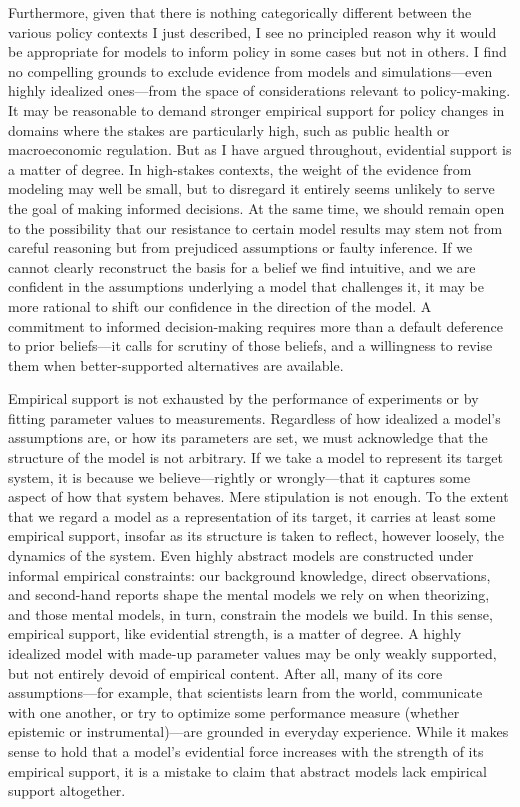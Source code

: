 \documentclass{article}
\begin{document}
Furthermore, given that there is nothing categorically different between the various policy contexts I just described, I see no principled reason why it would be appropriate for models to inform policy in some cases but not in others. I find no compelling grounds to exclude evidence from models and simulations—even highly idealized ones—from the space of considerations relevant to policy-making. It may be reasonable to demand stronger empirical support for policy changes in domains where the stakes are particularly high, such as public health or macroeconomic regulation. But as I have argued throughout, evidential support is a matter of degree. In high-stakes contexts, the weight of the evidence from modeling may well be small, but to disregard it entirely seems unlikely to serve the goal of making informed decisions. At the same time, we should remain open to the possibility that our resistance to certain model results may stem not from careful reasoning but from prejudiced assumptions or faulty inference. If we cannot clearly reconstruct the basis for a belief we find intuitive, and we are confident in the assumptions underlying a model that challenges it, it may be more rational to shift our confidence in the direction of the model. A commitment to informed decision-making requires more than a default deference to prior beliefs—it calls for scrutiny of those beliefs, and a willingness to revise them when better-supported alternatives are available.

Empirical support is not exhausted by the performance of experiments or by fitting parameter values to measurements. Regardless of how idealized a model's assumptions are, or how its parameters are set, we must acknowledge that the structure of the model is not arbitrary. If we take a model to represent its target system, it is because we believe—rightly or wrongly—that it captures some aspect of how that system behaves. Mere stipulation is not enough. To the extent that we regard a model as a representation of its target, it carries at least some empirical support, insofar as its structure is taken to reflect, however loosely, the dynamics of the system. Even highly abstract models are constructed under informal empirical constraints: our background knowledge, direct observations, and second-hand reports shape the mental models we rely on when theorizing, and those mental models, in turn, constrain the models we build. In this sense, empirical support, like evidential strength, is a matter of degree. A highly idealized model with made-up parameter values may be only weakly supported, but not entirely devoid of empirical content. After all, many of its core assumptions—for example, that scientists learn from the world, communicate with one another, or try to optimize some performance measure (whether epistemic or instrumental)—are grounded in everyday experience. While it makes sense to hold that a model's evidential force increases with the strength of its empirical support, it is a mistake to claim that abstract models lack empirical support altogether.
\end{document}
